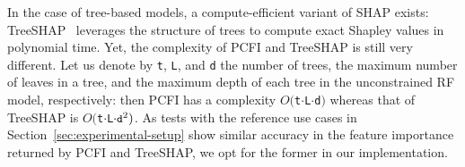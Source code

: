 \documentclass[journal]{IEEEtran}
\theoremstyle{plain} %
\newcommand{\bb}[1]{\textcolor{orange}{[Beyza: #1]}}
\newcommand{\var}[1]{\texttt{\small{#1}}}
\begin{document}
In the case of tree-based models, a compute-efficient variant of SHAP exists: TreeSHAP~\cite{treeSHAP} leverages the structure of trees to compute exact Shapley values in polynomial time.
Yet, the complexity of PCFI and TreeSHAP is still very different. Let us denote by \var{t}, \var{L}, and \var{d} the number of trees, the maximum number of leaves in a tree, and the maximum depth of each tree in the unconstrained RF model, respectively: then PCFI has a complexity $O($\var{t}$\cdot$\var{L}$\cdot$\var{d}$)$ whereas that of TreeSHAP is $O($\var{t}$\cdot$\var{L}$\cdot \var{d}^2)$.
As tests with the reference use cases in Section~\ref{sec:experimental-setup} show similar accuracy in the feature importance returned by PCFI and TreeSHAP, we opt for the former in our implementation.
%
%
%
\end{document}
